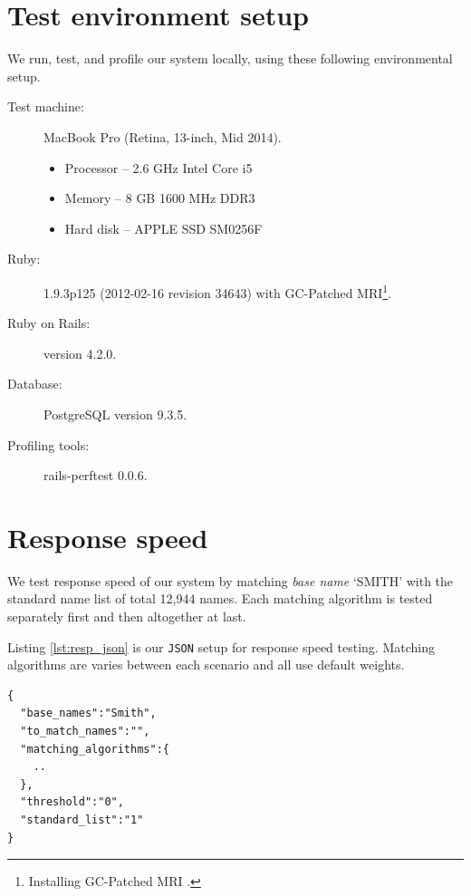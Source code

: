 \section{Test environment setup}
\label{sec:testenv}

We run, test, and profile our system locally, using these following
environmental setup.

\begin{description}
  \item[Test machine:] MacBook Pro (Retina, 13-inch, Mid 2014).
    \begin{itemize}
      \item Processor -- 2.6 GHz Intel Core i5
      \item Memory -- 8 GB 1600 MHz DDR3
      \item Hard disk -- APPLE SSD SM0256F
    \end{itemize}
  \item[Ruby:] 1.9.3p125 (2012-02-16 revision 34643) with
    GC-Patched MRI\footnote{Installing GC-Patched MRI \cite[]{perftest}.}.
  \item[Ruby on Rails:] version 4.2.0.
  \item[Database:] PostgreSQL version 9.3.5.
  \item[Profiling tools:] rails-perftest \cite[]{perftest} 0.0.6.
\end{description}

\section{Response speed}

We test response speed of our system by matching \emph{base name} `SMITH'
with the standard name list of total 12,944 names. Each matching algorithm
is tested separately first and then altogether at last.

Listing \ref{lst:resp_json} is our \texttt{JSON} setup for response speed
testing. Matching algorithms are varies between each scenario
and all use default weights.

\begin{minipage}{\linewidth}
  \begin{lstlisting}[label={lst:resp_json}, caption={\texttt{JSON} setup for performance testing.}]
{
  "base_names":"Smith",
  "to_match_names":"",
  "matching_algorithms":{
    ..
  },
  "threshold":"0",
  "standard_list":"1"
}
\end{lstlisting}
\end{minipage}

